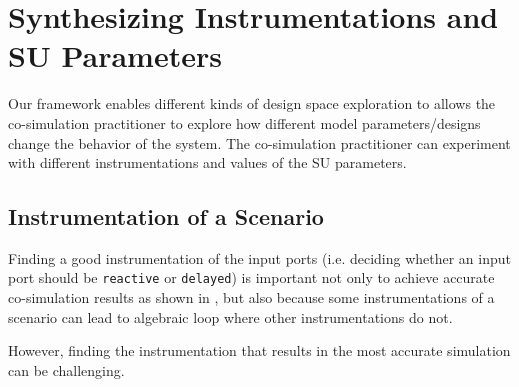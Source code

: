 
\section{Synthesizing Instrumentations and SU Parameters}\label{sc:DSE}
Our framework enables different kinds of design space exploration to allows the co-simulation practitioner to explore how different model parameters/designs change the behavior of the system.
The co-simulation practitioner can experiment with different instrumentations and values of the SU parameters.

\subsection{Instrumentation of a Scenario}
Finding a good instrumentation of the input ports (i.e. deciding whether an input port should be \texttt{reactive} or \texttt{delayed}) is important not only to achieve accurate co-simulation results as shown in \cite{Gomes2019,Oakes2021,hansen_verification_2021}, but also because some instrumentations of a scenario can lead to algebraic loop where other instrumentations do not.

However, finding the instrumentation that results in the most accurate simulation can be challenging.%

